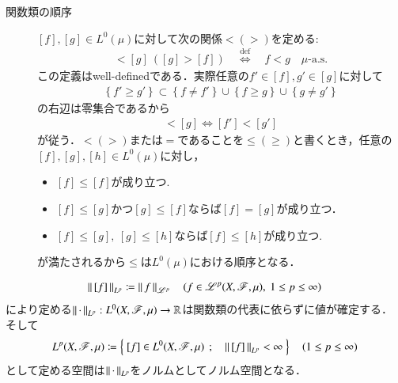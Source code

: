 \begin{description}
	\item[関数類の順序]
		$[f],[g] \in L^0(\mu)$に対して次の関係$<(>)$を定める:
		\begin{align}
			[f] < [g]\ \left( [g] > [f] \right) \quad
			\overset{\mathrm{def}}{\Longleftrightarrow}
			\quad f < g \quad \mbox{$\mu$-a.s.} \label{dfn:equiv_class_order}
		\end{align}
		この定義はwell-definedである．実際任意の$f' \in [f],g' \in [g]$に対して
		\begin{align}
			\left\{ f' \geq g' \right\} \subset \left\{ f \neq f' \right\} \cup \left\{ f \geq g \right\} \cup \left\{ g \neq g' \right\}
		\end{align}
		の右辺は零集合であるから
		\begin{align}
			[f] < [g] \Leftrightarrow [f'] < [g']
		\end{align}
		が従う．$<(>)$または$=$であることを$\leq(\geq)$と書くとき，任意の$[f],[g],[h] \in L^0(\mu)$に対し，
		\begin{itemize}
			\item $[f] \leq [f]$が成り立つ.
			\item $[f] \leq [g]$かつ$[g] \leq [f]$ならば$[f] = [g]$が成り立つ．
			\item $[f] \leq [g],\ [g] \leq [h]$ならば$[f] \leq [h]$が成り立つ.
		\end{itemize}
		が満たされるから$\leq$は$L^0(\mu)$における順序となる．
\end{description}

\begin{screen}
	\begin{lem}[商空間におけるノルムの定義]
		\begin{align}
			\left\|\, [f]\, \right\|_{L^p} \coloneqq \left\|\, f\, \right\|_{\mathscr{L}^p} 
			\quad (f \in \mathscr{L}^p(X,\mathscr{F},\mu),\ 1 \leq p \leq \infty)
		\end{align}
		により定める$\left\|\, \cdot\, \right\|_{L^p}:L^0(X,\mathscr{F},\mu) \rightarrow \mathbb{R}$は関数類の代表に依らずに値が確定する．
		そして
		\begin{align}
			L^p(X,\mathscr{F},\mu) \coloneqq \left\{\ [f] \in L^0(X,\mathscr{F},\mu)\ \, ; \quad \left\|\, [f]\, \right\|_{L^p} < \infty\ \right\} \quad (1 \leq p \leq \infty)
		\end{align}
		として定める空間は$\left\|\, \cdot\, \right\|_{L^p}$をノルムとしてノルム空間となる．
	\end{lem}
\end{screen}

